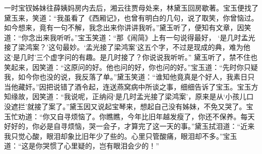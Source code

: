 \begin{parag}


    一时宝钗姊妹往薛姨妈房内去后，湘云往贾母处来，林黛玉回房歇著。宝玉便找了黛玉来，笑道：“我虽看了《西厢记》，也曾有明白的几句，说了取笑，你曾恼过。如今想来，竟有一句不解，我念出来你讲讲我听。”黛玉听了，便知有文章，因笑道：“你念出来我听听。”宝玉笑道：“那《闹简》上有一句说得最好， ‘是几时孟光接了梁鸿案？’这句最妙。‘孟光接了梁鸿案’这五个字，不过是现成的典，难为他这‘是几时’三个虚字问的有趣。是几时接了？你说说我听听。” 黛玉听了，禁不住也笑起来，因笑道：“这原问的好。他也问的好，你也问的好。”宝玉道：“先时你只疑我，如今你也没的说，我反落了单。”黛玉笑道：“谁知他竟真是个好人，我素日只当他藏奸。”因把说错了酒令起，连送燕窝病中所谈之事，细细告诉了宝玉。宝玉方知缘故，因笑道：“我说呢，正纳闷‘是几时孟光接了梁鸿案’，原来是从‘小孩儿口没遮拦’就接了案了。”黛玉因又说起宝琴来，想起自己没有姊妹，不免又哭了。宝玉忙劝道：“你又自寻烦恼了。你瞧瞧，今年比旧年越发瘦了，你还不保养。每天好好的，你必是自寻烦恼，哭一会子，才算完了这一天的事。”黛玉拭泪道：“近来我只觉心酸，眼泪却象比旧年少了些的。心里只管酸痛，眼泪却不多。”宝玉道：“这是你哭惯了心里疑的，岂有眼泪会少的！”
\end{parag}


